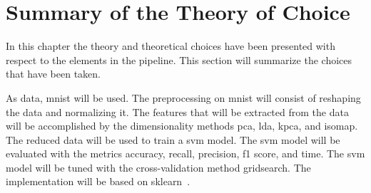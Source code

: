 \section{Summary of the Theory of Choice}\label{sec:theory-choice-summary}
In this chapter the theory and theoretical choices have been presented with respect to the elements in the pipeline. This section will summarize the choices that have been taken.


As data, \gls{mnist} will be used. The preprocessing on \gls{mnist} will consist of reshaping the data and normalizing it. The features that will be extracted from the data will be accomplished by the dimensionality methods \gls{pca}, \gls{lda}, \gls{kpca}, and \gls{isomap}. The reduced data will be used to train a \gls{svm} model. The \gls{svm} model will be evaluated with the metrics accuracy, recall, precision, f1 score, and time. The \gls{svm} model will be tuned with the cross-validation method gridsearch. The implementation will be based on \gls{sklearn}~\cite{scikit-learn}. 